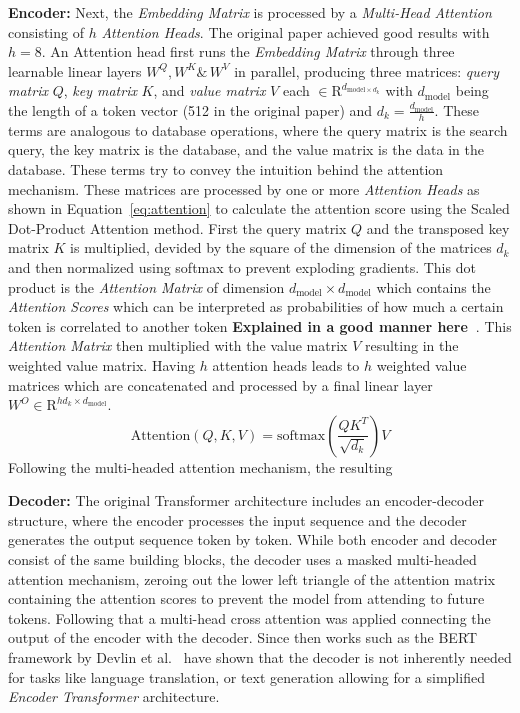 \textbf{Encoder:} Next, the \emph{Embedding Matrix} is processed by a \emph{Multi-Head Attention} consisting of $h$ \emph{Attention Heads}.
The original paper achieved good results with $h=8$.
An Attention head first runs the \emph{Embedding Matrix} through three learnable linear layers $W^Q, W^K \&\, W^V$ in parallel, producing three matrices: \emph{query matrix} $Q$, \emph{key matrix} $K$, and \emph{value matrix} $V$ each $\in \mathrm{R}^{d_{\text{model}\times d_k}}$ with $d_{\text{model}}$ being the length of a token vector (512 in the original paper) and $d_k = \frac{d_{\text{model}}}{h}$. 
These terms are analogous to database operations, where the query matrix is the search query, the key matrix is the database, and the value matrix is the data in the database. 
These terms try to convey the intuition behind the attention mechanism.
These matrices are processed by one or more \emph{Attention Heads} as shown in Equation~\ref{eq:attention} to calculate the attention score using the Scaled Dot-Product Attention method. 
First the query matrix $Q$ and the transposed key matrix $K$ is multiplied, devided by the square of the dimension of the matrices $d_k$ and then normalized using softmax to prevent exploding gradients.
This dot product is the \emph{Attention Matrix} of dimension $d_{\text{model}}\times d_{\text{model}}$ which contains the \emph{Attention Scores} which can be interpreted as probabilities of how much a certain token is correlated to another token \textbf{Explained in a good manner here~\cite{Han2023}}. 
This \emph{Attention Matrix} then multiplied with the value matrix $V$ resulting in the weighted value matrix.
Having $h$ attention heads leads to $h$ weighted value matrices which are concatenated and processed by a final linear layer $W^O \in \mathrm{R}^{hd_k \times d_{\text{model}}}$.
\begin{equation}
    \text{Attention}(Q, K, V) = \text{softmax}\left(\frac{QK^{T}}{\sqrt{d_{k}}}\right)V
    \label{eq:attention}
\end{equation}
Following the multi-headed attention mechanism, the resulting 

\textbf{Decoder:} The original Transformer architecture includes an encoder-decoder structure, where the encoder processes the input sequence and the decoder generates the output sequence token by token. While both encoder and decoder consist of the same building blocks, the decoder uses a masked multi-headed attention mechanism, zeroing out the lower left triangle of the attention matrix containing the attention scores to prevent the model from attending to future tokens. 
Following that a multi-head cross attention was applied connecting the output of the encoder with the decoder.
Since then works such as the BERT framework by Devlin et al.~\cite{Devlin2018} have shown that the decoder is not inherently needed for tasks like language translation, or text generation allowing for a simplified \emph{Encoder Transformer} architecture.

